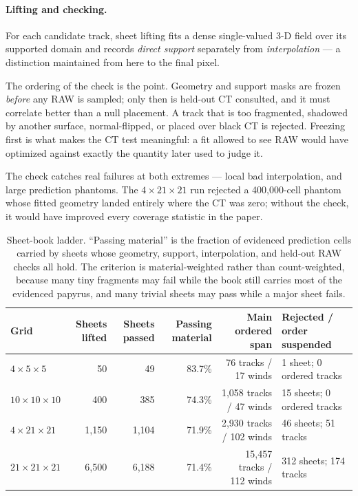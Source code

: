 \paragraph{Lifting and checking.} For each candidate track, sheet lifting fits a dense single-valued 3-D field over its supported domain and records \emph{direct support} separately from \emph{interpolation} --- a distinction maintained from here to the final pixel.

The ordering of the check is the point. Geometry and support masks are frozen \emph{before} any RAW is sampled; only then is held-out CT consulted, and it must correlate better than a null placement. A track that is too fragmented, shadowed by another surface, normal-flipped, or placed over black CT is rejected. Freezing first is what makes the CT test meaningful: a fit allowed to see RAW would have optimized against exactly the quantity later used to judge it.

The check catches real failures at both extremes --- local bad interpolation, and large prediction phantoms. The $4\times21\times21$ run rejected a 400,000-cell phantom whose fitted geometry landed entirely where the CT was zero; without the check, it would have improved every coverage statistic in the paper.

\begin{table}[t]
  \caption{Sheet-book ladder. ``Passing material'' is the fraction of evidenced prediction cells carried by sheets whose geometry, support, interpolation, and held-out RAW checks all hold. The criterion is material-weighted rather than count-weighted, because many tiny fragments may fail while the book still carries most of the evidenced papyrus, and many trivial sheets may pass while a major sheet fails.}
  \label{tab:sheet-book}
  \centering
  \small
  \begin{tabular}{@{}lrrrrl@{}}
    \toprule
    Grid & Sheets lifted & Sheets passed & Passing material & Main ordered span & Rejected / order suspended \\
    \midrule
    $4\times5\times5$ & 50 & 49 & 83.7\% & 76 tracks / 17 winds & 1 sheet; 0 ordered tracks \\
    $10\times10\times10$ & 400 & 385 & 74.3\% & 1,058 tracks / 47 winds & 15 sheets; 0 ordered tracks \\
    $4\times21\times21$ & 1,150 & 1,104 & 71.9\% & 2,930 tracks / 102 winds & 46 sheets; 51 tracks \\
    $21\times21\times21$ & 6,500 & 6,188 & 71.4\% & 15,457 tracks / 112 winds & 312 sheets; 174 tracks \\
    \bottomrule
  \end{tabular}
\end{table}

